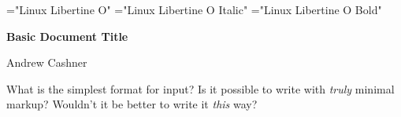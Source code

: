 \font\libertine="Linux Libertine O"
\font\libertineitalic="Linux Libertine O Italic"
\font\libertinebold="Linux Libertine O Bold"
\let\tenrm\libertine
\let\tenit\libertineitalic
\let\tenbf\libertinebold
\libertine

\def\emph #1{{\it #1\/}}

\def\beginheader{\begingroup\parindent=0pt}
\def\endheader{\par\endgroup\par\vskip 2\baselineskip}
\def\title{\par\bf}
\def\author{\par\rm}

\beginheader
\title Basic Document Title
\author Andrew Cashner
\endheader

What is the simplest format for input?
Is it possible to write with {\it truly\/} minimal markup?
Wouldn't it be better to write it \emph{this} way?

\bye

